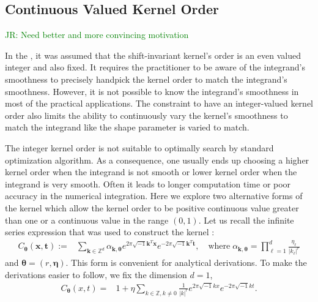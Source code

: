 \documentclass{svjour3}                     %
\newcommand{\bm}[1]{\boldsymbol{#1}}
\newcommand{\veta}{{\bm{\eta}}}
\newcommand{\vtheta}{{\bm{\theta}}}
\newcommand{\vk}{\bm{k}}
\newcommand{\vt}{\bm{t}}
\newcommand{\vx}{\bm{x}}
\def\abs#1{\ensuremath{\left \lvert #1 \right \rvert}}
\newcommand{\JRNote}[1]{{\textcolor{green}{JR: #1}}}
\begin{document}
\subsection{Continuous Valued Kernel Order}
\label{sec:non_integer_kernel_order}

\JRNote{Need better and more convincing motivation}

In the \cite{JagHic19a}%
, it was assumed that the shift-invariant kernel's order is an even valued integer and also fixed. It requires the practitioner to be aware of the integrand's smoothness to precisely handpick the kernel order to match the integrand's smoothness. However, it is not possible to know the integrand's smoothness in most of the practical applications. The constraint to have an integer-valued kernel order also limits the ability to continuously vary the kernel's smoothness to match the integrand like the shape parameter is varied to match. 

The integer kernel order is not suitable to optimally search by standard optimization algorithm.
As a consequence, one usually ends up choosing a higher kernel order when the integrand is not  smooth or lower kernel order when the integrand is very smooth.
Often it leads to longer computation time or poor accuracy in the numerical integration.
Here we explore two alternative forms of the kernel which allow the kernel order to be positive continuous value greater than one or a continuous value in the range $(0,1)$. Let us recall the infinite series expression that was used to construct the kernel \cite{JagHic19a}: %
\begin{align*}
C_\vtheta(\vx, \vt) := &  \sum_{\vk \in \mathbb{Z}^d} \alpha_{\vk,\vtheta}  e^{2 \pi\sqrt{-1} \vk^T\vx}
e^{-2 \pi\sqrt{-1} \vk^T\vt}, \quad \text{where} \; 
\alpha_{\vk,\vtheta} = \prod_{\ell=1}^d \frac{\eta_\ell}{{|k_\ell|}^r} 
\end{align*}
and $\vtheta = (r, \veta)$.  This form is convenient for analytical derivations.
To make the derivations easier to follow, we fix the dimension $d=1$,
\begin{align*}
C_\vtheta(x, t) = & 1 + \eta \sum_{k \in \mathbb{Z}, k \neq 0 } \frac{1}{\abs{k}^r} 
e^{ 2 \pi\sqrt{-1} k x}
e^{-2 \pi\sqrt{-1} k t}.
\end{align*}
\end{document}
